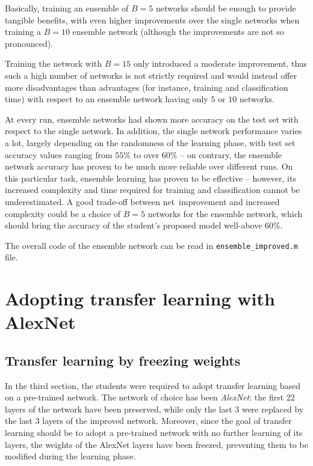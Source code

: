 \documentclass[a4paper, 11pt]{article} %
\begin{document}
Basically, training an ensemble of $B=5$ networks should be enough to provide tangible benefits, with even higher improvements over the single networks when training a $B=10$ ensemble network (although the improvements are not so pronounced).

Training the network with $B=15$ only introduced a moderate improvement, thus such a high number of networks is not strictly required and would instead offer more disadvantages than advantages (for instance, training and classification time) with respect to an ensemble network having only $5$ or $10$ networks.

At every run, ensemble networks had shown more accuracy on the test set with respect to the single network. In addition, the single network performance varies a lot, largely depending on the randomness of the learning phase, with test set accuracy values ranging from $55\%$ to over $60\%$ \--- on contrary, the ensemble network accuracy has proven to be much more reliable over different runs. On this particular task, ensemble learning has proven to be effective \--- however, its increased complexity and time required for training and classification cannot be underestimated. A good trade-off between net~improvement and increased complexity could be a choice of $B=5$ networks for the ensemble network, which should bring the accuracy of the student's proposed model well-above $60\%$.

The overall code of the ensemble network can be read in \texttt{ensemble\_improved.m} file.
 
\section{Adopting transfer learning with AlexNet}
\subsection{Transfer learning by freezing weights}\label{sec:transfer-learning-1}

In the third section, the students were required to adopt transfer learning based on a pre-trained network. The network of choice has been \emph{AlexNet}: the first $22$ layers of the network have been preserved, while only the last $3$ were replaced by the last $3$ layers of the improved network. Moreover, since the goal of transfer learning should be to adopt a pre-trained network with no further learning of its layers, the weights of the AlexNet layers have been freezed, preventing them to be modified during the learning phase. 
\end{document}
